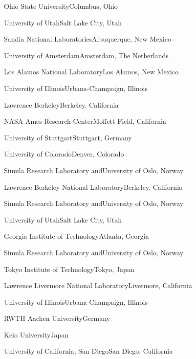 \begin{multicols}{2}
 {Ohio State University}{Columbus, Ohio}

 {University of Utah}{Salt Lake City,
Utah}

 {Sandia National
Laboratories}{Albuquerque, New Mexico}

 {University of Amsterdam}{Amsterdam,
The Netherlands}

 {Los Alamos National Laboratory}{Los
Alamos, New Mexico}

 {University of
Illinois}{Urbana-Champaign, Illinois}

 {Lawrence Berkeley}{Berkeley, California}

 {NASA Ames Research Center}{Moffett Field,
California}

 {University of Stuttgart}{Stuttgart,
Germany}

 {University of Colorado}{Denver, Colorado}

{Simula Research Laboratory and}{University of Oslo, Norway}

 {Lawrence Berkeley National
Laboratory}{Berkeley, California}

{Simula Research Laboratory and}{University of Oslo, Norway}

 {University of Utah}{Salt Lake City, Utah}

 {Georgia Institute of Technology}{Atlanta,
Georgia}

{Simula Research Laboratory and}{University of Oslo, Norway}

 {Tokyo Institute of Technology}{Tokyo,
Japan}

 {Lawrence Livermore National
Laboratory}{Livermore, California}

 {University of Illinois}{Urbana-Champaign,
Illinois}

 {RWTH Aachen University}{Germany}

 {Keio University}{Japan}

 {University of California, San
Diego}{San Diego, California}


\end{multicols}
